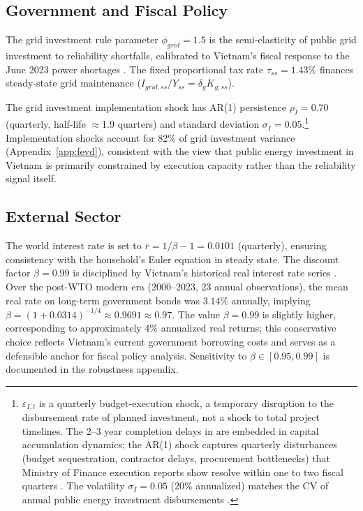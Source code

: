 	\subsection{Government and Fiscal Policy}
	The grid investment rule parameter $\phi_{grid} = 1.5$ is the semi-elasticity of public grid investment to reliability shortfalls, calibrated to Vietnam's fiscal response to the June 2023 power shortages \citep{evn2023,worldbank2022}. The fixed proportional tax rate $\tau_{ss} = 1.43\%$ finances steady-state grid maintenance ($I_{grid,ss}/Y_{ss} = \delta_g K_{g,ss}$).
	
	The grid investment implementation shock has AR(1) persistence $\rho_I = 0.70$ (quarterly, half-life $\approx$1.9 quarters) and standard deviation $\sigma_I = 0.05$.\footnote{$\varepsilon_{I,t}$ is a quarterly budget-execution shock, a temporary disruption to the disbursement rate of planned investment, not a shock to total project timelines. The 2--3 year completion delays in \citet{worldbank2022} are embedded in capital accumulation dynamics; the AR(1) shock captures quarterly disturbances (budget sequestration, contractor delays, procurement bottlenecks) that Ministry of Finance execution reports show resolve within one to two fiscal quarters \citep{mof2023}. The volatility $\sigma_I = 0.05$ (20\% annualized) matches the CV of annual public energy investment disbursements \citep{worldbank2022}.} 	Implementation shocks account for 82\% of grid investment variance (Appendix~\ref{app:fevd}), consistent with the view that public energy investment in Vietnam is primarily constrained by execution capacity rather than the reliability signal itself.
	
	\subsection{External Sector} \label{subsec:external_sector}

	The world interest rate is set to $\bar{r} = 1/\beta - 1 = 0.0101$ (quarterly), ensuring consistency with the household's Euler equation in steady state. The discount factor $\beta = 0.99$ is disciplined by Vietnam's historical real interest rate series \citep{worldbank2024}. Over the post-WTO modern era (2000--2023, 23 annual observations), the mean real rate on long-term government bonds was $3.14\%$ annually, implying $\beta = (1 + 0.0314)^{-1/4} \approx 0.9691 \approx 0.97$. The value $\beta = 0.99$ is slightly higher, corresponding to approximately $4\%$ annualized real returns; this conservative choice reflects Vietnam's current government borrowing costs and serves as a defensible anchor for fiscal policy analysis. Sensitivity to $\beta \in [0.95, 0.99]$ is documented in the robustness appendix.
	
